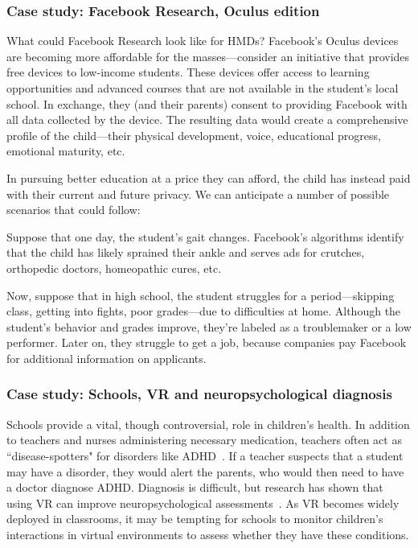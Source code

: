 \subsubsection{Case study: Facebook Research, Oculus edition}

What could Facebook Research look like for HMDs? Facebook's Oculus devices are becoming more affordable for the masses---consider an initiative that provides free devices to low-income students. These devices offer access to learning opportunities and advanced courses that are not available in the student's local school. In exchange, they (and their parents) consent to providing Facebook with all data collected by the device. The resulting data would create a comprehensive profile of the child---their physical development, voice, educational progress, emotional maturity, etc.

In pursuing better education at a price they can afford, the child has instead paid with their current and future privacy. We can anticipate a number of possible scenarios that could follow:

Suppose that one day, the student's gait changes. Facebook's algorithms identify that the child has likely sprained their ankle and serves ads for crutches, orthopedic doctors, homeopathic cures, etc.

Now, suppose that in high school, the student struggles for a period---skipping class, getting into fights, poor grades---due to difficulties at home. Although the student's behavior and grades improve, they're labeled as a troublemaker or a low performer. Later on, they struggle to get a job, because companies pay Facebook for additional information on applicants.

\subsubsection{Case study: Schools, VR and neuropsychological diagnosis}

Schools provide a vital, though controversial, role in children's health. In addition to teachers and nurses administering necessary medication, teachers often act as ``disease-spotters" for disorders like ADHD~\cite{phillips2006medicine}. If a teacher suspects that a student may have a disorder, they would alert the parents, who would then need to have a doctor diagnose ADHD. Diagnosis is difficult, but research has shown that using VR can improve neuropsychological assessments~\cite{areces2018analysis}. As VR becomes widely deployed in classrooms, it may be tempting for schools to monitor children's interactions in virtual environments to assess whether they have these conditions.

